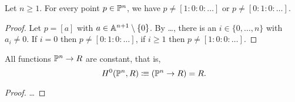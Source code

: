 \begin{lemma}
  Let $n \geq 1$.
  For every point $p \in \mathbb{P}^n$,
  we have $p \neq [1 : 0 : 0 : \dots]$
  or $p \neq [0 : 1 : 0 : \dots]$.
\end{lemma}

\begin{proof}
  Let $p = [a]$ with $a \in \mathbb{A}^{n+1} \setminus \{0\}$.
  By \dots,
  there is an $i \in \{0, \dots, n\}$ with $a_i \neq 0$.
  If $i = 0$ then $p \neq [0 : 1 : 0 : \dots]$,
  if $i \geq 1$ then $p \neq [1 : 0 : 0 : \dots]$.
\end{proof}

\begin{theorem}
  All functions $\mathbb{P}^n \to R$ are constant,
  that is,
  \[ H^0(\bP^n, R) \colonequiv (\bP^n \to R) = R \rlap{.} \]
\end{theorem}

\begin{proof}
  \dots
\end{proof}
